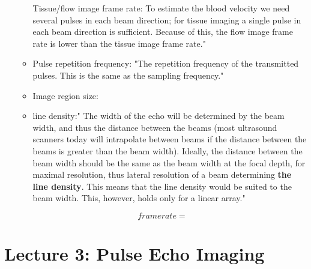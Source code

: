\documentclass[10pt,a4paper,noendnumber=true]{scrartcl}
\begin{document}
\begin{itemize}
\begin{itemize}
Tissue/flow image frame rate: To estimate the blood velocity we need several pulses in each beam direction; for tissue imaging a single pulse in each beam direction is sufficient. Because of this, the flow image frame rate is lower than the tissue image frame rate."
\item Pulse repetition frequency: "The repetition frequency of the transmitted pulses. This is the same as the sampling frequency."
\item Image region size:
\item line density:" The width of the echo will be determined by the beam width, and thus the distance between the beams (most ultrasound scanners today will intrapolate between beams if the distance between the beams is greater than the beam width). Ideally, the distance between the beam width should be the same as the beam width at the focal depth, for maximal resolution, thus lateral resolution of a beam determining \textbf{the line density}. This means that the line density would be suited to the beam width. This, however, holds only for a linear array."
\end{itemize}

\begin{equation}
framerate=
\end{equation}

\end{itemize}

\newpage
\section{Lecture 3: Pulse Echo Imaging}
\end{document}
